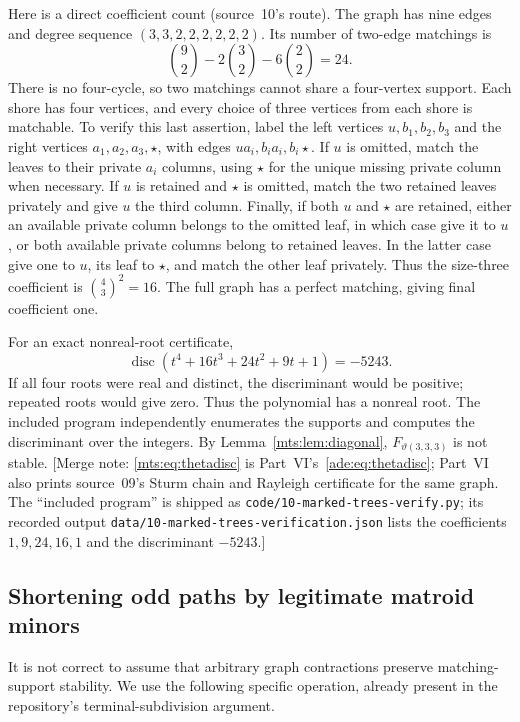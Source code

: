 \documentclass[11pt]{article}
\numberwithin{equation}{section}
\theoremstyle{definition}
\begin{document}
Here is a direct coefficient count (source~10's route). The graph has nine edges and degree
sequence $(3,3,2,2,2,2,2,2)$. Its number of two-edge matchings is
\[
 \binom92-2\binom32-6\binom22=24.
\]
There is no four-cycle, so two matchings cannot share a four-vertex
support. Each shore has four vertices, and every choice of three vertices
from each shore is matchable. To verify this last assertion, label the
left vertices $u,b_1,b_2,b_3$ and the right vertices $a_1,a_2,a_3,\star$,
with edges $ua_i,b_ia_i,b_i\star$. If $u$ is omitted, match the leaves to
their private $a_i$ columns, using $\star$ for the unique missing private
column when necessary. If $u$ is retained and $\star$ is omitted, match
the two retained leaves privately and give $u$ the third column. Finally,
if both $u$ and $\star$ are retained, either an available private column
belongs to the omitted leaf, in which case give it to $u$, or both
available private columns belong to retained leaves. In the latter case
give one to $u$, its leaf to $\star$, and match the other leaf privately.
Thus the size-three coefficient is $\binom43^2=16$. The full graph has a
perfect matching, giving final coefficient one.

For an exact nonreal-root certificate,
\begin{equation}
 \operatorname{disc}(t^4+16t^3+24t^2+9t+1)=-5243.
 \label{mts:eq:thetadisc}
\end{equation}
If all four roots were real and distinct, the discriminant would be
positive; repeated roots would give zero. Thus the polynomial has a
nonreal root. The included program independently enumerates the supports
and computes the discriminant over the integers. By
Lemma~\ref{mts:lem:diagonal}, $F_{\vartheta(3,3,3)}$ is not stable.
[Merge note: \eqref{mts:eq:thetadisc} is Part~VI's~\eqref{ade:eq:thetadisc};
Part~VI also prints source~09's Sturm chain and Rayleigh certificate for
the same graph. The ``included program'' is shipped as
\nolinkurl{code/10-marked-trees-verify.py}; its recorded output
\nolinkurl{data/10-marked-trees-verification.json} lists the coefficients
$1,9,24,16,1$ and the discriminant $-5243$.]

\subsection{Shortening odd paths by legitimate matroid minors}

It is not correct to assume that arbitrary graph contractions preserve
matching-support stability. We use the following specific operation,
already present in the repository's terminal-subdivision argument.
\end{document}

